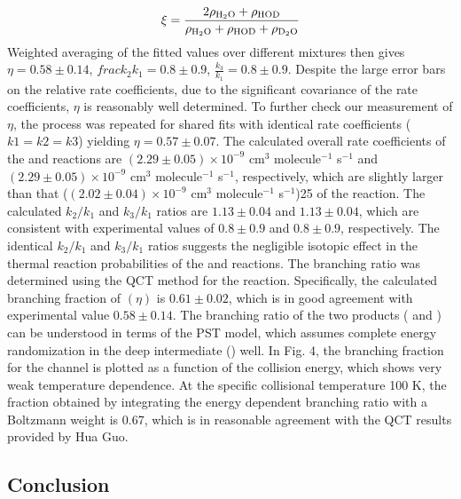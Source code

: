 \begin{equation}
	\xi = \frac{2 \rho_{\ce{H2O}} + \rho_{\ce{HOD}}}{\rho_{\ce{H2O}} + \rho_{\ce{HOD}} + \rho_{\ce{D2O}}}
\end{equation}
Weighted averaging of the fitted values over different mixtures then gives $\eta = 0.58 \pm 0.14$, $frac{k_2}{k_1} = 0.8 \pm 0.9$, $\frac{k_3}{k_1} = 0.8 \pm 0.9$. Despite the large error bars on the relative rate coefficients, due to the significant covariance of the rate coefficients, $\eta$ is reasonably well determined. To further check our measurement of $\eta$, the process was repeated for shared fits with identical rate coefficients ($k1 = k2 = k3$) yielding $\eta = 0.57 \pm 0.07$. The calculated overall rate coefficients of the  and  reactions are $(2.29 \pm 0.05) \times 10^{-9}$ cm$^3$ molecule$^{-1}$ s$^{-1}$ and $(2.29 \pm 0.05) \times 10^{-9}$ cm$^3$ molecule$^{-1}$ s$^{-1}$, respectively, which are slightly larger than that ($(2.02 \pm 0.04) \times 10^{-9}$ cm$^3$ molecule$^{-1}$ s$^{-1}$)25 of the  reaction. The calculated $k_2/k_1$ and $k_3/k_1$ ratios are $1.13 \pm 0.04$ and $1.13 \pm 0.04$, which are consistent with experimental values of $0.8 \pm 0.9$ and $0.8 \pm 0.9$, respectively. The identical $k_2/k_1$ and $k_3/k_1$ ratios suggests the negligible isotopic effect in the thermal reaction probabilities of the  and  reactions. The branching ratio was determined using the QCT method for the  reaction. Specifically, the calculated branching fraction of  $(\eta)$ is $0.61 \pm 0.02$, which is in good agreement with experimental value $0.58 \pm 0.14$. The branching ratio of the two products ( and ) can be understood in terms of the PST model, which assumes complete energy randomization in the deep intermediate () well. In Fig. 4, the branching fraction for the  channel is plotted as a function of the collision energy, which shows very weak temperature dependence. At the specific collisional temperature 100 K, the fraction obtained by integrating the energy dependent branching ratio with a Boltzmann weight is 0.67, which is in reasonable agreement with the QCT results provided by Hua Guo.\cite{Chen2019}

\subsection{Conclusion}

